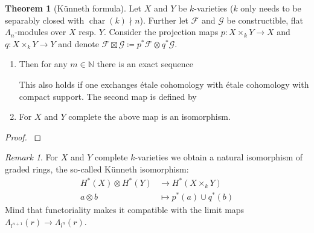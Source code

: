 \documentclass[english]{scrartcl}
\theoremstyle{definition}
\newtheorem{Thm}[Def]{Theorem}
\theoremstyle{remark}
\newtheorem{Rem}[Def]{Remark}
\newcommand*{\N}{\mathds{N}}
\newcommand*{\Z}{\mathds{Z}}
\newcommand*{\Zmod}[1]{\Z/#1} %
\newcommand*{\F}{\mathcal{F}} %
\newcommand*{\G}{\mathcal{G}} %
\DeclareMathOperator{\Char}{char} %
\DeclareMathOperator{\Tor}{Tor} %
\begin{document}
\begin{Thm}[Künneth formula]\label{kuennethiso}
  Let $X$ and $Y$ be $k$-varieties
  ($k$ only needs to be separably closed with $\Char(k)\nmid n$).
  Further let $\F$ and $\G$ be constructible, flat $\Lambda_n$-modules
  over $X$ resp. $Y$.
  Consider the projection maps
  $p\colon X\times_k Y\to X$ and
  $q\colon X\times_k Y\to Y$ and denote
  $\F\boxtimes\G\coloneqq p^*\F\otimes q^*\G$. 
  \begin{enumerate}
  \item   Then for any $m\in\N$ there is an exact sequence
    \begin{center}
    \end{center}
    This also holds if one exchanges étale cohomology with étale
    cohomology with compact support.
    The second map is defined by
    \begin{center}
    \end{center}
  \item For $X$ and $Y$ complete the above map is an isomorphism. 
  \end{enumerate}
  \begin{proof}\cite[][Thm.~V.8.5 and Cor.~V.8.13]{milnebook}\end{proof}
\end{Thm}

\begin{Rem}
  For $X$ and $Y$ complete $k$-varieties we obtain a natural
  isomorphism of graded rings, the so-called Künneth isomorphism:
  \begin{align*}
    H^*(X)\otimes H^*(Y) &\rightarrow H^*(X\times_k Y)\\
    a\otimes b &\mapsto p^*(a) \cup q^*(b)
  \end{align*}
  Mind that functoriality makes it compatible with the limit maps
  $\Lambda_{l^{n+1}}(r)\to\Lambda_{l^n}(r)$.
\end{Rem}
\end{document}
